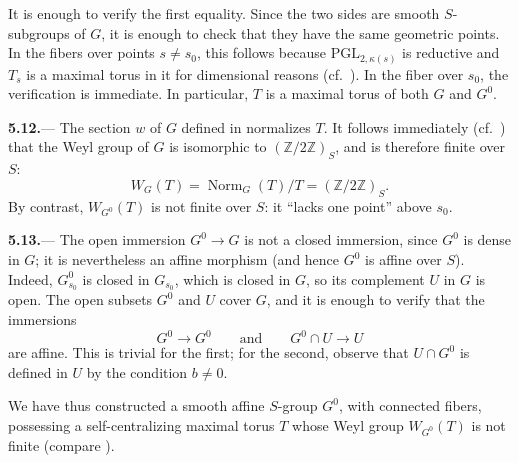 
It is enough to verify the first equality.  Since the two sides are
smooth \(S\)-subgroups of \(G\), it is enough to check that they have
the same geometric points.  In the fibers over points \(s\ne s_0\),
this follows because \(\mathrm{PGL}_{2,\kappa(s)}\) is reductive and
\(T_s\) is a maximal torus in it for dimensional reasons
\textup{(cf.\ )}.  In the fiber over \(s_0\), the verification is
immediate.  In particular, \(T\) is a maximal torus of both \(G\)
and \(G^0\).

\par\medskip\noindent
\textbf{5.12.}---
The section \(w\) of \(G\) defined in  normalizes \(T\).
It follows immediately \textup{(cf.\ )} that the Weyl group of
\(G\) is isomorphic to \((\mathbb Z/2\mathbb Z)_S\), and is therefore
finite over \(S\):
\[
  W_G(T)=\operatorname{Norm}_G(T)/T
        =(\mathbb Z/2\mathbb Z)_S.
\]
By contrast, \(W_{G^0}(T)\) is not finite over \(S\): it ``lacks one
point'' above \(s_0\).

\par\medskip\noindent
\textbf{5.13.}---
The open immersion \(G^0\to G\) is not a closed immersion, since
\(G^0\) is dense in \(G\); it is nevertheless an affine morphism
\textup{(and hence \(G^0\) is affine over \(S\))}.  Indeed,
\(G^0_{s_0}\) is closed in \(G_{s_0}\), which is closed in \(G\), so
its complement \(U\) in \(G\) is open.  The open subsets \(G^0\) and
\(U\) cover \(G\), and it is enough to verify that the immersions
\[
  G^0\longrightarrow G^0
  \qquad\text{and}\qquad
  G^0\cap U\longrightarrow U
\]
are affine.  This is trivial for the first; for the second, observe
that \(U\cap G^0\) is defined in \(U\) by the condition \(b\ne0\).

We have thus constructed a smooth affine \(S\)-group \(G^0\), with
connected fibers, possessing a self-centralizing maximal torus \(T\)
whose Weyl group \(W_{G^0}(T)\) is not finite \textup{(compare
)}.


